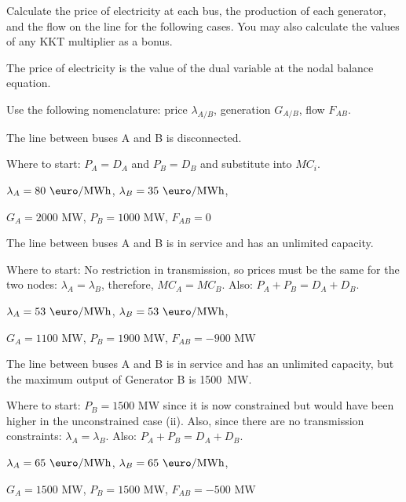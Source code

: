 \documentclass[11pt,a4paper,fleqn]{scrartcl}
\def\l{\lambda}
\def\mw{\text{ MW}}
\def\emwh{\text{ \euro/MWh}}
\begin{document}
\begin{enumerate}[(a)]
 \begin{shaded}\item Calculate the price of electricity at each bus, the production
  of each generator, and the flow on the line for the following cases. You may also calculate the values of any KKT multiplier as a bonus.\end{shaded}

The price of electricity is the value of the dual variable at the nodal balance equation.

 Use the following nomenclature: price $\lambda_{A/B}$, generation $G_{A/B}$, flow $F_{AB}$.
 \begin{enumerate}[(i)]
  \begin{shaded}\item The line between buses A and B is disconnected.\end{shaded}

  Where to start: $P_A=D_A$ and $P_B=D_B$ and substitute into $MC_i$.

  $\l_A= 80\emwh$, $\l_B=35\emwh$,

  $G_{A}=2000$ MW, $P_B=1000$ MW, $F_{AB}=0$

  \begin{shaded}\item The line between buses A and B is in service and has an unlimited capacity.\end{shaded}
  
  Where to start:
  No restriction in transmission, so prices must be the same for the two nodes: $\l_A = \l_B$, therefore, $MC_A = MC_B$.
  Also: $P_A+P_B = D_A+D_B$.

    $\l_A= 53\emwh$, $\l_B=53\emwh$,

  $G_{A}=1100\mw$, $P_B=1900$ MW, $F_{AB}=-900\mw$

  \begin{shaded}\item The line between buses A and B is in service and has an unlimited capacity, but the maximum output of Generator B is 1500~MW.\end{shaded}
  
  Where to start:
  $P_B=1500$ MW since it is now constrained but would have been higher in the unconstrained case (ii). 
  Also, since there are no transmission constraints: $\l_A = \l_B$.
  Also: $P_A+P_B = D_A+D_B$.

    $\l_A= 65\emwh$, $\l_B=65\emwh$,

  $G_{A}=1500\mw$, $P_B=1500$ MW, $F_{AB}=-500\mw$


\end{enumerate}
\end{enumerate}
\end{document}
